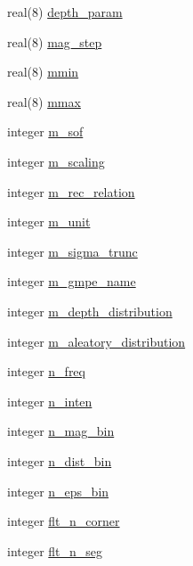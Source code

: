 \begin{DoxyCompactItemize}
\item 
real(8) \hyperlink{namespaceinput__module_af24dc133394110c4b8722a650aa7aab5}{depth\+\_\+param}
\item 
real(8) \hyperlink{namespaceinput__module_a5f4a6ebb1c94126c9810b316e17976e2}{mag\+\_\+step}
\item 
real(8) \hyperlink{namespaceinput__module_a6f6194544ef970071393414d02104a8f}{mmin}
\item 
real(8) \hyperlink{namespaceinput__module_a41ea519c5d8ed0def5faaee53d32171e}{mmax}
\item 
integer \hyperlink{namespaceinput__module_afb3ee34150e00c5c18dddd5db73c0b9f}{m\+\_\+sof}
\item 
integer \hyperlink{namespaceinput__module_ac8f94aead42fc3c3c63f6b80156c4392}{m\+\_\+scaling}
\item 
integer \hyperlink{namespaceinput__module_acb06b69e7ed3cec59c693ab700ae7bc7}{m\+\_\+rec\+\_\+relation}
\item 
integer \hyperlink{namespaceinput__module_a1a7790113ec65bfe00fa926b09b6a451}{m\+\_\+unit}
\item 
integer \hyperlink{namespaceinput__module_a418d22665630502982d2925663df35cc}{m\+\_\+sigma\+\_\+trunc}
\item 
integer \hyperlink{namespaceinput__module_a2426a45f38ebf777bbda4d215a04a11a}{m\+\_\+gmpe\+\_\+name}
\item 
integer \hyperlink{namespaceinput__module_acf6263946873708989398bfd2f91bbef}{m\+\_\+depth\+\_\+distribution}
\item 
integer \hyperlink{namespaceinput__module_a39c97f997959a940d039403c89a2b62c}{m\+\_\+aleatory\+\_\+distribution}
\item 
integer \hyperlink{namespaceinput__module_a9c4337d8e000b4ec09cd937de3fec1a4}{n\+\_\+freq}
\item 
integer \hyperlink{namespaceinput__module_a8e9793e0bad76077bc065ec13bc34910}{n\+\_\+inten}
\item 
integer \hyperlink{namespaceinput__module_a16e17c304087bd6dbbca884d691c3c6a}{n\+\_\+mag\+\_\+bin}
\item 
integer \hyperlink{namespaceinput__module_ad9cff8fcf1650cc924462f2409ade59d}{n\+\_\+dist\+\_\+bin}
\item 
integer \hyperlink{namespaceinput__module_a048d1cd2097b01c570f91e1166300c4d}{n\+\_\+eps\+\_\+bin}
\item 
integer \hyperlink{namespaceinput__module_ab43a73209bacb0daeff92dd8758952b6}{flt\+\_\+n\+\_\+corner}
\item 
integer \hyperlink{namespaceinput__module_ab8cf9e7e4661e076527f292296cca198}{flt\+\_\+n\+\_\+seg}
\end{DoxyCompactItemize}


